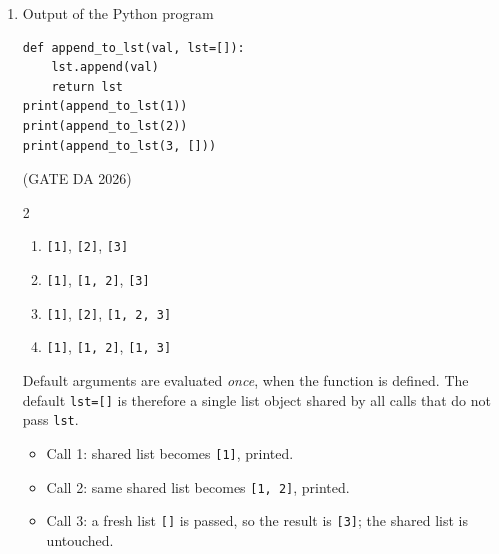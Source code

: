 \begin{enumerate}[label=\textbf{Q.\arabic*},leftmargin=*,start=1]
\item[\textbf{Q.16}] Output of the Python program
\begin{lstlisting}
def append_to_lst(val, lst=[]):
    lst.append(val)
    return lst
print(append_to_lst(1))
print(append_to_lst(2))
print(append_to_lst(3, []))
\end{lstlisting}
\hfill (GATE DA 2026)
\begin{multicols}{2}
\begin{enumerate}[label=(\alph*),itemsep=0pt]
 \item \texttt{[1]}, \texttt{[2]}, \texttt{[3]}
 \item \texttt{[1]}, \texttt{[1, 2]}, \texttt{[3]}
 \item \texttt{[1]}, \texttt{[2]}, \texttt{[1, 2, 3]}
 \item \texttt{[1]}, \texttt{[1, 2]}, \texttt{[1, 3]}
\end{enumerate}
\end{multicols}
\solution
Default arguments are evaluated \emph{once}, when the function is defined. The default
\texttt{lst=[]} is therefore a single list object shared by all calls that do not pass
\texttt{lst}.
\begin{itemize}
 \item Call 1: shared list becomes \texttt{[1]}, printed.
 \item Call 2: same shared list becomes \texttt{[1, 2]}, printed.
 \item Call 3: a fresh list \texttt{[]} is passed, so the result is \texttt{[3]}; the shared list is untouched.
\end{itemize}


\end{enumerate}
